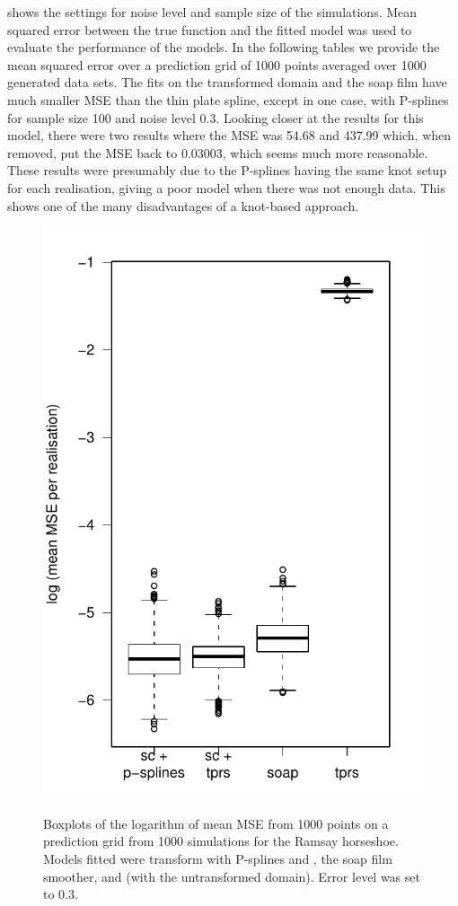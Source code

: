  shows the settings for noise level and sample size of the simulations. Mean squared error between the true function and the fitted model was used to evaluate the performance of the models. In the following tables we provide the mean squared error over a prediction grid of 1000 points averaged over 1000 generated data sets. The fits on the transformed domain and the soap film have much smaller MSE than the thin plate spline, except in one case, \sch with P-splines for sample size 100 and noise level 0.3. Looking closer at the results for this model, there were two results where the MSE was 54.68 and 437.99 which, when removed, put the MSE back to 0.03003, which seems much more reasonable. These results were presumably due to the P-splines having the same knot setup for each realisation, giving a poor model when there was not enough data. This shows one of the many disadvantages of a knot-based approach.

\begin{figure}
\centering
\includegraphics{sc/figs/sc-mses-boxplot.pdf} \\
\caption{Boxplots of the logarithm of mean MSE from 1000 points on a prediction grid from 1000 simulations for the Ramsay horseshoe. Models fitted were \sch transform with P-splines and \tprs, the soap film smoother, and \tprs (with the untransformed domain). Error level was set to 0.3.}
\label{scram1000boxplots}
\end{figure}

